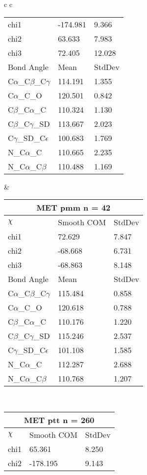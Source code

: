 \begin{longtable}{ c c }
\begin{tabular}{ l l l }
  chi1 & -174.981 & 9.366 \\ 
  chi2 & 63.633 & 7.983 \\ 
  chi3 & 72.405 & 12.028 \\ \midrule
  Bond Angle   & Mean     & StdDev \\ \midrule
  C$\alpha$\_C$\beta$\_C$\gamma$ & 114.191 & 1.355\\
  C$\alpha$\_C\_O & 120.501 & 0.842\\
  C$\beta$\_C$\alpha$\_C & 110.324 & 1.130\\
  C$\beta$\_C$\gamma$\_SD & 113.667 & 2.023\\
  C$\gamma$\_SD\_C$\epsilon$ & 100.683 & 1.769\\
  N\_C$\alpha$\_C & 110.665 & 2.235\\
  N\_C$\alpha$\_C$\beta$ & 110.488 & 1.169\\
  \bottomrule
  \end{tabular}
  &
  \begin{tabular}{ l l l }
  \toprule
  \multicolumn{3}{c}{MET \textbf{pmm} n = 42} \\ \toprule
  $\chi$       & Smooth COM & StdDev \\ \midrule
  chi1 & 72.629 & 7.847 \\ 
  chi2 & -68.668 & 6.731 \\ 
  chi3 & -68.863 & 8.148 \\ \midrule
  Bond Angle   & Mean     & StdDev \\ \midrule
  C$\alpha$\_C$\beta$\_C$\gamma$ & 115.484 & 0.858\\
  C$\alpha$\_C\_O & 120.618 & 0.788\\
  C$\beta$\_C$\alpha$\_C & 110.176 & 1.220\\
  C$\beta$\_C$\gamma$\_SD & 115.246 & 2.537\\
  C$\gamma$\_SD\_C$\epsilon$ & 101.108 & 1.585\\
  N\_C$\alpha$\_C & 112.287 & 2.688\\
  N\_C$\alpha$\_C$\beta$ & 110.768 & 1.207\\
  \bottomrule
  \end{tabular}
  \\
  \begin{tabular}{ l l l }
  \toprule
  \multicolumn{3}{c}{MET \textbf{ptt} n = 260} \\ \toprule
  $\chi$       & Smooth COM & StdDev \\ \midrule
  chi1 & 65.361 & 8.250 \\ 
  chi2 & -178.195 & 9.143 \\ 

\end{tabular}
\end{longtable}
